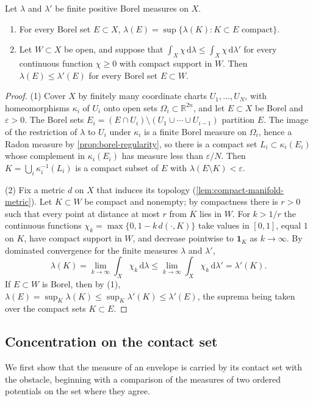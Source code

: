 \begin{lemma}\label{lem:measure-comparison-continuous-tests}
Let $\lambda$ and $\lambda'$ be finite positive Borel measures on $X$.
\begin{enumerate}
 \item For every Borel set $E\subset X$, $\lambda(E)=\sup\{\lambda(K):K\subset E\text{ compact}\}$.
 \item Let $W\subset X$ be open, and suppose that $\int_X\chi\,\mathrm d\lambda\leq\int_X\chi\,\mathrm d\lambda'$ for every continuous function $\chi\geq0$ with compact support in $W$. Then $\lambda(E)\leq\lambda'(E)$ for every Borel set $E\subset W$.
\end{enumerate}
\end{lemma}
\begin{proof}
(1) Cover $X$ by finitely many coordinate charts $U_1,\ldots,U_N$, with homeomorphisms $\kappa_i$ of $U_i$ onto open sets $\Omega_i\subset\mathbb R^{2n}$, and let $E\subset X$ be Borel and $\varepsilon>0$. The Borel sets $E_i=(E\cap U_i)\setminus(U_1\cup\cdots\cup U_{i-1})$ partition $E$. The image of the restriction of $\lambda$ to $U_i$ under $\kappa_i$ is a finite Borel measure on $\Omega_i$, hence a Radon measure by \cref{prop:borel-regularity}, so there is a compact set $L_i\subset\kappa_i(E_i)$ whose complement in $\kappa_i(E_i)$ has measure less than $\varepsilon/N$. Then $K=\bigcup_i\kappa_i^{-1}(L_i)$ is a compact subset of $E$ with $\lambda(E\setminus K)<\varepsilon$.

(2) Fix a metric $d$ on $X$ that induces its topology (\cref{lem:compact-manifold-metric}). Let $K\subset W$ be compact and nonempty; by compactness there is $r>0$ such that every point at distance at most $r$ from $K$ lies in $W$. For $k>1/r$ the continuous functions $\chi_k=\max\{0,1-k\,d(\cdot,K)\}$ take values in $[0,1]$, equal $1$ on $K$, have compact support in $W$, and decrease pointwise to $\mathbf1_K$ as $k\to\infty$. By dominated convergence for the finite measures $\lambda$ and $\lambda'$,
\[
 \lambda(K)=\lim_{k\to\infty}\int_X\chi_k\,\mathrm d\lambda\leq\lim_{k\to\infty}\int_X\chi_k\,\mathrm d\lambda'=\lambda'(K).
\]
If $E\subset W$ is Borel, then by (1), $\lambda(E)=\sup_K\lambda(K)\leq\sup_K\lambda'(K)\leq\lambda'(E)$, the suprema being taken over the compact sets $K\subset E$.
\end{proof}

\subsection{Concentration on the contact set}
\label{sec:envelope-contact-concentration}
We first show that the measure of an envelope is carried by its contact set with the obstacle, beginning with a comparison of the measures of two ordered potentials on the set where they agree.


